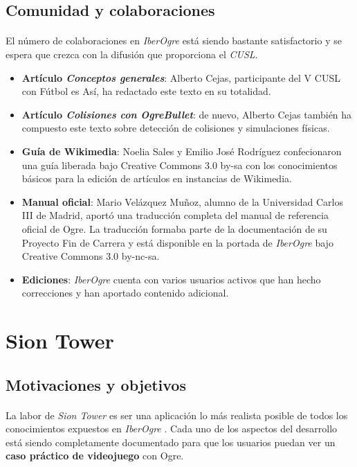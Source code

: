 \documentclass[16pt,spanish]{article}
\def \juego{\emph {Sion Tower} }
\def \wiki{\emph{IberOgre} }
\begin{document}
\subsection{Comunidad y colaboraciones}

\paragraph{}
El número de colaboraciones en \wiki está siendo bastante satisfactorio
y se espera que crezca con la difusión que proporciona el \emph{CUSL}.

\begin{itemize}
    \item \textbf{Artículo \emph{Conceptos generales}}: Alberto Cejas,
    participante del V CUSL con Fútbol es Así, ha redactado este texto
    en su totalidad.
    \item \textbf{Artículo \emph{Colisiones con OgreBullet}}: de nuevo,
    Alberto Cejas también ha compuesto este texto sobre detección de colisiones
    y simulaciones físicas.
    \item \textbf{Guía de Wikimedia}: Noelia Sales y Emilio José
    Rodríguez confecionaron una guía liberada bajo Creative Commons
    3.0 by-sa con los conocimientos básicos para la edición de artículos en
    instancias de Wikimedia.
    \item \textbf{Manual oficial}: Mario Velázquez Muñoz,
    alumno de la Universidad Carlos III de Madrid, aportó una traducción
    completa del manual de referencia oficial de Ogre. La traducción formaba
    parte de la documentación de su Proyecto Fin de Carrera y está disponible
    en la portada de \wiki bajo Creative Commons 3.0 by-nc-sa.
    \item \textbf{Ediciones}: \wiki cuenta con varios usuarios activos
    que han hecho correcciones y han aportado contenido adicional.
\end{itemize}

\section{Sion Tower}

\subsection{Motivaciones y objetivos}

\paragraph{}
La labor de \juego es ser una aplicación lo más realista posible de todos
los conocimientos expuestos en \wiki. Cada uno de los aspectos del desarrollo
está siendo completamente documentado para que los usuarios puedan ver
un \textbf{caso práctico de videojuego} con Ogre.
\end{document}
